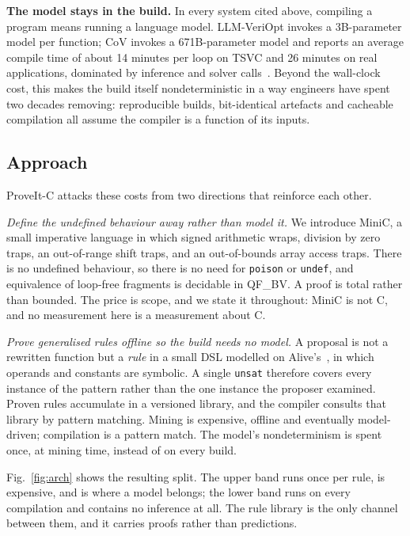 \documentclass[conference]{IEEEtran}
\begin{document}
\textbf{The model stays in the build.} In every system cited above, compiling a
program means running a language model. LLM-VeriOpt invokes a 3B-parameter
model per function; CoV invokes a 671B-parameter model and reports an average
compile time of about 14 minutes per loop on TSVC and 26 minutes on real
applications, dominated by inference and solver calls~\cite{cov}. Beyond the
wall-clock cost, this makes the build itself nondeterministic in a way
engineers have spent two decades removing: reproducible builds, bit-identical
artefacts and cacheable compilation all assume the compiler is a function of
its inputs.

\subsection{Approach}

ProveIt-C attacks these costs from two directions that reinforce each other.

\textit{Define the undefined behaviour away rather than model it.} We introduce
MiniC, a small imperative language in which signed arithmetic wraps, division
by zero traps, an out-of-range shift traps, and an out-of-bounds array access
traps. There is no undefined behaviour, so there is no need for \texttt{poison}
or \texttt{undef}, and equivalence of loop-free fragments is decidable in
QF\_BV. A proof is total rather than bounded. The price is scope, and we state
it throughout: MiniC is not C, and no measurement here is a measurement about
C.

\textit{Prove generalised rules offline so the build needs no model.} A
proposal is not a rewritten function but a \emph{rule} in a small DSL modelled
on Alive's~\cite{alive}, in which operands and constants are symbolic. A single
\texttt{unsat} therefore covers every instance of the pattern rather than the
one instance the proposer examined. Proven rules accumulate in a versioned
library, and the compiler consults that library by pattern matching. Mining is
expensive, offline and eventually model-driven; compilation is a pattern match.
The model's nondeterminism is spent once, at mining time, instead of on every
build.

Fig.~\ref{fig:arch} shows the resulting split. The upper band runs once per
rule, is expensive, and is where a model belongs; the lower band runs on every
compilation and contains no inference at all. The rule library is the only
channel between them, and it carries proofs rather than predictions.
\end{document}

